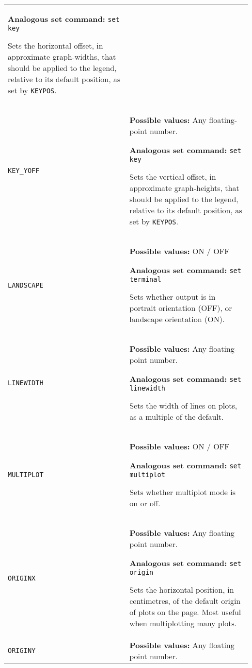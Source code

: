 \documentclass[a4paper,onecolumn,11pt]{book}
\begin{document}
\begin{longtable}{p{3.4cm}p{9cm}}
                   \textbf{Analogous set command:} \texttt{set key}\index{set key command@\texttt{set key} command}

                   Sets the horizontal offset, in approximate graph-widths, that should be applied to the legend, relative to its default position, as set by \texttt{KEYPOS}.
                   \\
\texttt{KEY\_YOFF} & \textbf{Possible values:} Any floating-point number.

                   \textbf{Analogous set command:} \texttt{set key}\index{set key command@\texttt{set key} command}

                   Sets the vertical offset, in approximate graph-heights, that should be applied to the legend, relative to its default position, as set by \texttt{KEYPOS}.
                   \\
\texttt{LANDSCAPE} & \textbf{Possible values:} ON / OFF

                   \textbf{Analogous set command:} \texttt{set terminal}\index{set terminal command@\texttt{set terminal} command}

                   Sets whether output is in portrait orientation (OFF), or landscape orientation (ON).
                   \\
\texttt{LINEWIDTH} & \textbf{Possible values:} Any floating-point number.

                   \textbf{Analogous set command:} \texttt{set linewidth}\index{set linewidth command@\texttt{set linewidth} command}

                   Sets the width of lines on plots, as a  multiple of the default.
                   \\
\texttt{MULTIPLOT} & \textbf{Possible values:} ON / OFF

                   \textbf{Analogous set command:} \texttt{set multiplot}\index{set multiplot command@\texttt{set multiplot} command}

                   Sets whether multiplot mode is on or off.
                   \\
\texttt{ORIGINX} & \textbf{Possible values:} Any floating point number.

                   \textbf{Analogous set command:} \texttt{set origin}\index{set origin command@\texttt{set origin} command}

                   Sets the horizontal position, in centimetres, of the default origin of plots on the page. Most useful when multiplotting many plots.
                   \\
\texttt{ORIGINY} & \textbf{Possible values:} Any floating point number.


\end{longtable}
\end{document}
